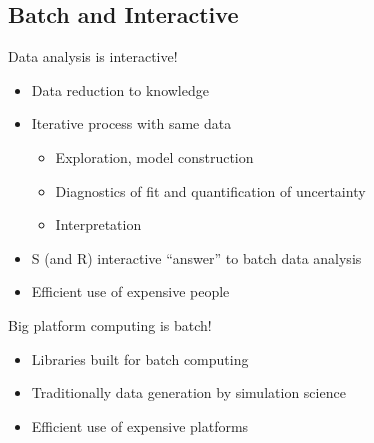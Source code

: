 \subsection{Batch and Interactive}
\makesubcontentsslidessec

\begin{frame}
  \begin{block}{Data analysis is interactive!}
    \pause
    \begin{itemize}[<+-|alert@+>]
    \item Data reduction to knowledge
    \item Iterative process with same data
      \begin{itemize}
      \item Exploration, model construction
      \item Diagnostics of fit and quantification of uncertainty
      \item Interpretation
      \end{itemize}
    \item S (and R) interactive ``answer'' to batch data analysis
    \item Efficient use of expensive people
    \end{itemize}
  \end{block}
  \begin{block}{Big platform computing is batch!}
    \pause
    \begin{itemize}[<+-|alert@+>]
    \item Libraries built for batch computing
    \item Traditionally data generation by simulation science
    \item Efficient use of expensive platforms
    \end{itemize}
  \end{block}
\end{frame}

